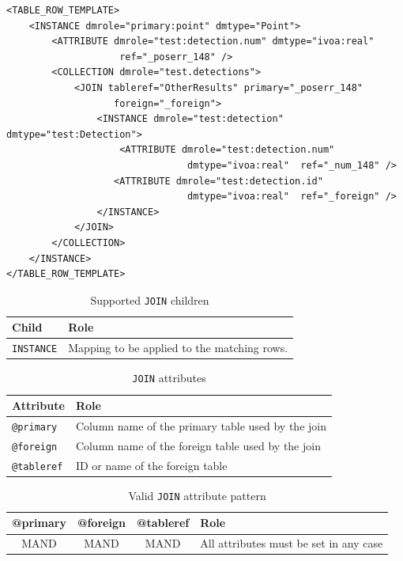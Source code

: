 \documentclass[11pt,a4paper]{ivoa}
\begin{document}
\begin{lstlisting}[caption={JOIN example},style=XML]
<TABLE_ROW_TEMPLATE>
    <INSTANCE dmrole="primary:point" dmtype="Point">
        <ATTRIBUTE dmrole="test:detection.num" dmtype="ivoa:real"
                    ref="_poserr_148" />
        <COLLECTION dmrole="test.detections">
            <JOIN tableref="OtherResults" primary="_poserr_148"
                   foreign="_foreign">
                <INSTANCE dmrole="test:detection"  dmtype="test:Detection">
                    <ATTRIBUTE dmrole="test:detection.num" 
                                dmtype="ivoa:real"  ref="_num_148" />
                   <ATTRIBUTE dmrole="test:detection.id" 
                                dmtype="ivoa:real"  ref="_foreign" />
                </INSTANCE>
            </JOIN>
        </COLLECTION>
    </INSTANCE>
</TABLE_ROW_TEMPLATE>
\end{lstlisting}


\begin{table}[hbtp]
\small
\centering
\begin{tabulary}{\linewidth}{|L|J|}
\hline
    \textbf{Child} &
    \textbf{Role} \\
\hline
     \texttt{INSTANCE}    &
     Mapping to be applied to the matching rows.  \\       
\hline
\end{tabulary}
     \caption{Supported  \texttt{JOIN} children} 
     \label{tbl:join-children}
\end{table}

\begin{table}[!htbp]
\small
\centering
\begin{tabulary}{\linewidth}{|L|J|}
       \hline
           \textbf{Attribute} &  
           \textbf{Role} \\
       \hline  
           \texttt{@primary}    & 
           Column name of the primary table used  by the join \\       
       \hline  
           \texttt{@foreign}    & 
           Column name of the foreign table used  by the join \\       
      \hline  
           \texttt{@tableref}    & 
           ID or name of the foreign table \\       
       \hline 
\end{tabulary}
\caption{\texttt{JOIN} attributes} 
\label{tbl:join-att}
\end{table}

\begin{table}[!htbp]
\small
\centering
\begin{tabulary}{\linewidth}{|C|C|C|J|}
       \hline
           \textbf{@primary} &  
           \textbf{@foreign} &                     
           \textbf{@tableref} &          
           \textbf{Role} \\
       \hline  
           MAND    &            
           MAND    &            
           MAND    & 
           All attributes must be set in any case \\       
       \hline 
\end{tabulary}
\caption{Valid \texttt{JOIN} attribute pattern} 
\label{tbl:join-patterns}
\end{table}
\end{document}
